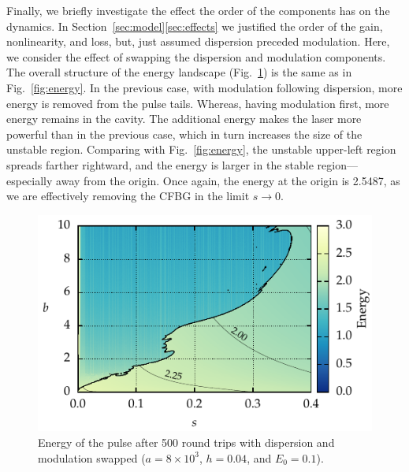 \documentclass[9pt,twocolumn,twoside]{osajnl}
\begin{document}
Finally, we briefly investigate the effect the order of the components has on the dynamics. In Section~\ref{sec:model}\ref{sec:effects} we justified the order of the gain, nonlinearity, and loss, but, just assumed dispersion preceded modulation. Here, we consider the effect of swapping the dispersion and modulation components. The overall structure of the energy landscape (Fig.~\ref{fig:energyswitch}) is the same as in Fig.~\ref{fig:energy}. In the previous case, with modulation following dispersion, more energy is removed from the pulse tails. Whereas, having modulation first, more energy remains in the cavity. The additional energy makes the laser more powerful than in the previous case, which in turn increases the size of the unstable region. Comparing with Fig.~\ref{fig:energy}, the unstable upper-left region spreads farther rightward, and the energy is larger in the stable region---especially away from the origin. Once again, the energy at the origin is 2.5487, as we are effectively removing the CFBG in the limit $s \rightarrow 0$.

\begin{figure}[tbp]
	\centering
	\includegraphics{Figures/ParamSpaceEnergySwitch}
	\caption{Energy of the pulse after 500 round trips with dispersion and modulation swapped ($a = 8 \times 10^3$, $h = 0.04$, and $E_0 = 0.1$).}
	\label{fig:energyswitch}
\end{figure}
\end{document}
